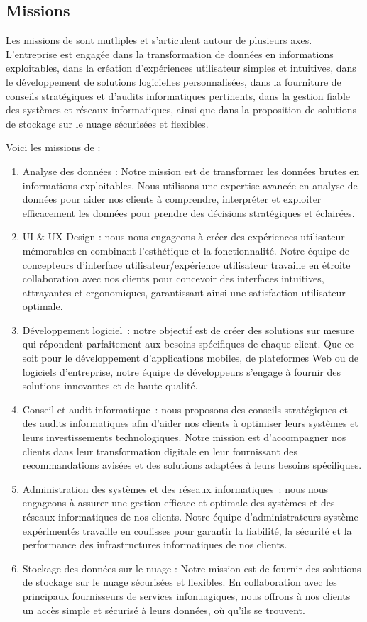 \subsection{Missions}
Les missions de \firm sont mutliples et s’articulent autour de plusieurs axes. L’entreprise
est engagée dans la transformation de données en informations exploitables, dans
la création d’expériences utilisateur simples et intuitives, dans le développement de solutions
logicielles personnalisées, dans la fourniture de conseils stratégiques et d’audits
informatiques pertinents, dans la gestion fiable des systèmes et réseaux informatiques,
ainsi que dans la proposition de solutions de stockage sur le nuage sécurisées et flexibles.

Voici les missions de \firm :
\begin{enumerate}
  \item Analyse des données : Notre mission est de transformer les données brutes
    en informations exploitables. Nous utilisons une expertise avancée en analyse
    de données pour aider nos clients à comprendre, interpréter et exploiter efficacement
    les données pour prendre des décisions stratégiques et éclairées.
  \item UI \& UX Design : nous nous engageons à créer des expériences utilisateur mémorables
    en combinant l’esthétique et la fonctionnalité. Notre équipe de concepteurs
    d’interface utilisateur/expérience utilisateur travaille en étroite collaboration
    avec nos clients pour concevoir des interfaces intuitives, attrayantes et ergonomiques,
    garantissant ainsi une satisfaction utilisateur optimale.
  \item Développement logiciel : notre objectif est de créer des solutions sur
    mesure qui répondent parfaitement aux besoins spécifiques de chaque client.
    Que ce soit pour le développement d’applications mobiles, de plateformes Web
    ou de logiciels d’entreprise, notre équipe de développeurs s’engage à fournir
    des solutions innovantes et de haute qualité.
  \item Conseil et audit informatique : nous proposons des conseils stratégiques
    et des audits informatiques afin d’aider nos clients à optimiser leurs systèmes
    et leurs investissements technologiques. Notre mission est d’accompagner nos
    clients dans leur transformation digitale en leur fournissant des recommandations
    avisées et des solutions adaptées à leurs besoins spécifiques.
  \item Administration des systèmes et des réseaux informatiques : nous nous
    engageons à assurer une gestion efficace et optimale des systèmes et des
    réseaux informatiques de nos clients. Notre équipe d’administrateurs système
    expérimentés travaille en coulisses pour garantir la fiabilité, la sécurité et
    la performance des infrastructures informatiques de nos clients.
  \item Stockage des données sur le nuage : Notre mission est de fournir des solutions
    de stockage sur le nuage sécurisées et flexibles. En collaboration avec les
    principaux fournisseurs de services infonuagiques, nous offrons à nos clients
    un accès simple et sécurisé à leurs données, où qu’ils se trouvent.
\end{enumerate}

